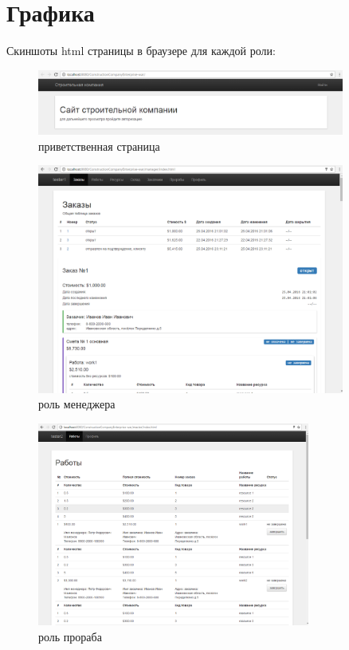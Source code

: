 \section{Графика}
Скиншоты html страницы в браузере для каждой роли:
\begin{figure}[!ht]
	\centering
	\includegraphics[width=0.9\textwidth]{img/main.png}
	\caption{приветственная страница}
\end{figure}
\begin{figure}[!ht]
	\centering
	\includegraphics[width=0.9\textwidth]{img/manager.png}
	\caption{роль менеджера}
\end{figure}
\newpage
\begin{figure}[!ht]
	\centering
	\includegraphics[width=0.8\textwidth]{img/master.png}
	\caption{роль прораба}
\end{figure}

